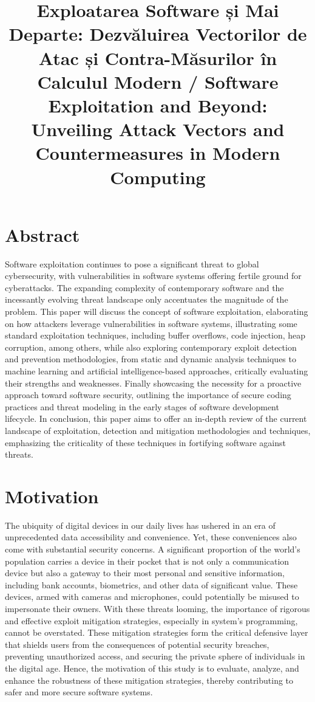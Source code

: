 \documentclass{article}
\begin{document}
\title{Exploatarea Software și Mai Departe: Dezvăluirea Vectorilor de Atac și Contra-Măsurilor în Calculul Modern / Software Exploitation and Beyond: Unveiling Attack Vectors and Countermeasures in Modern Computing}
\maketitle
\section{Abstract}%

Software exploitation continues to pose a significant threat to global cybersecurity, with vulnerabilities in software systems offering fertile ground for cyberattacks. The expanding complexity of contemporary software and the incessantly evolving threat landscape only accentuates the magnitude of the problem. This paper will discuss the concept of software exploitation, elaborating on how attackers leverage vulnerabilities in software systems, illustrating some standard exploitation techniques, including buffer overflows, code injection, heap corruption, among others, while also exploring contemporary exploit detection and prevention methodologies, from static and dynamic analysis techniques to machine learning and artificial intelligence-based approaches, critically evaluating their strengths and weaknesses. Finally showcasing the necessity for a proactive approach toward software security, outlining the importance of secure coding practices and threat modeling in the early stages of software development lifecycle. In conclusion, this paper aims to offer an in-depth review of the current landscape of exploitation, detection and mitigation methodologies and techniques, emphasizing the criticality of these techniques in fortifying software against threats.

\section{Motivation}%
The ubiquity of digital devices in our daily lives has ushered in an era of unprecedented data accessibility and convenience. Yet, these conveniences also come with substantial security concerns. A significant proportion of the world's population carries a device in their pocket that is not only a communication device but also a gateway to their most personal and sensitive information, including bank accounts, biometrics, and other data of significant value. These devices, armed with cameras and microphones, could potentially be misused to impersonate their owners. With these threats looming, the importance of rigorous and effective exploit mitigation strategies, especially in system's programming, cannot be overstated. These mitigation strategies form the critical defensive layer that shields users from the consequences of potential security breaches, preventing unauthorized access, and securing the private sphere of individuals in the digital age. Hence, the motivation of this study is to evaluate, analyze, and enhance the robustness of these mitigation strategies, thereby contributing to safer and more secure software systems.
\end{document}
